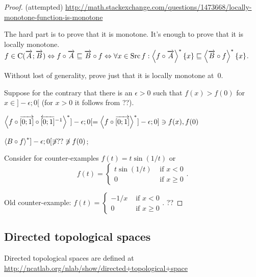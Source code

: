 \begin{proof} (attempted)
\url{http://math.stackexchange.com/questions/1473668/locally-monotone-function-is-monotone}

The hard part is to prove that it is monotone. It's enough to prove that it is locally monotone.
$f\in\mathrm{C}(\overrightarrow{A};\overrightarrow{B}) \Leftrightarrow
f\circ\overrightarrow{A} \sqsubseteq \overrightarrow{B}\circ f \Leftrightarrow
\forall x\in\operatorname{Src} f:\left\langle f\circ\overrightarrow{A}\right\rangle ^{\ast}\{x\} \sqsubseteq \left\langle \overrightarrow{B}\circ f\right\rangle ^{\ast}\{x\}
$.

Without lost of generality, prove just that it is locally monotone at~$0$.


Suppose for the contrary
that there is an $\epsilon>0$ such that $f(x) > f(0)$ for $x\in]-\epsilon;0[$ (for $x>0$ it follows from ??).

$\left\langle f\circ\overrightarrow{[0;1]}\circ\overleftarrow{[0;1]}^{-1}\right\rangle ^{\ast} ]-\epsilon;0[ =
\left\langle f\circ\overrightarrow{[0;1]}\right\rangle ^{\ast} ]-\epsilon;0] \ni f(x), f(0)$

$\left\langle B\circ f\right\rangle ^{\ast} ]-\epsilon;0[ \not\ni ?? \not\ni f(0)$;

Consider for counter-examples $f(t) = t\sin(1/t)$ or
\[ f(t) = \begin{cases}t\sin(1/t)&\text{ if }x<0\\0&\text{ if }x\ge 0\end{cases}. \]

Old counter-example: $f(t) = \begin{cases}-1/x&\text{ if }x<0\\0&\text{ if }x\ge 0\end{cases}$.
??
\end{proof}

\subsection{Directed topological spaces}

Directed topological spaces are defined at\\
\url{http://ncatlab.org/nlab/show/directed+topological+space}

